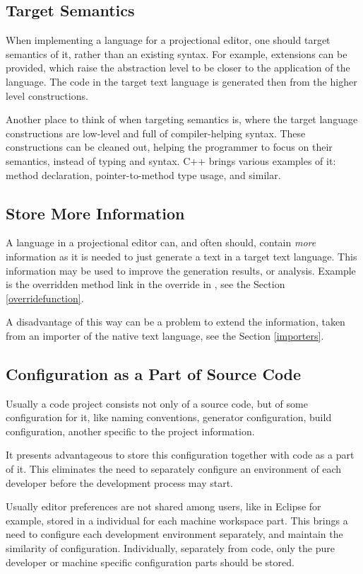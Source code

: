 \subsection{Target Semantics}

 When implementing a language for a projectional editor, one should target semantics of it, rather than an existing syntax.
For example, extensions can be provided, which raise the abstraction level to be closer to the application of the language.
The code in the target text language is generated then from the higher level constructions. 

Another place to think of when targeting semantics is, where the target language constructions are low-level and 
full of compiler-helping syntax. These constructions can be cleaned out, helping the programmer to focus on their
semantics, instead of typing and syntax. C++ brings various examples of it:  method declaration, 
pointer-to-method type usage, and similar.

\subsection{Store More Information}

 A language in a projectional editor can, and often should, contain \emph{more} information as it is needed 
 to just generate a text in a target text language. This information may be used to improve the generation results, or
 analysis. Example is the overridden method link in the override in \pcpp, see the Section \ref{overridefunction}.
 
 A disadvantage of this way can be a problem to extend the information, taken from an importer of the native text 
 language, see the Section \ref{importers}.

\subsection{Configuration as a Part of Source Code}
 Usually a code project consists not only of a source code, but of some configuration for it, like naming conventions, 
 generator configuration, build configuration, another specific to the project information.
 
 It presents advantageous to store this configuration together with code as a part of it. This eliminates the need 
 to separately configure an environment of each developer before the development process may start.

 Usually editor preferences are not shared among users, like in Eclipse for example, stored in a individual for each 
 machine workspace part. This brings a need to configure each development environment separately, and maintain the similarity
 of configuration. Individually, separately from code, only the pure developer or machine specific configuration parts 
 should be stored.

